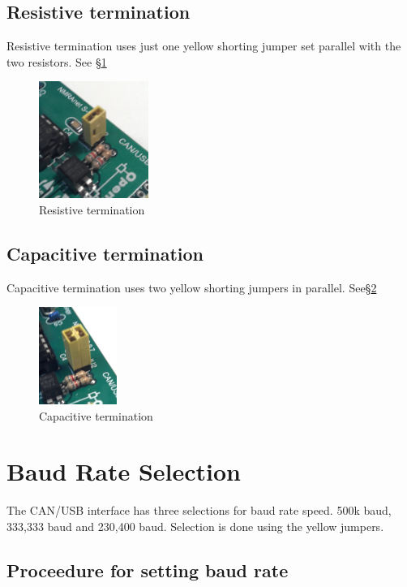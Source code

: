 \documentclass[15pt]{book}
\begin{document}
\subsection{Resistive termination}
Resistive termination uses just one yellow shorting jumper set parallel with the two resistors.  See \S\ref{ResTerm}
\begin{figure}[htbp]
\begin{center}
\includegraphics[height=1.5in]{images/term_resistive.png}
\caption{Resistive termination}
\label{ResTerm}
\end{center}
\end{figure}
\subsection{Capacitive termination}
Capacitive termination uses two yellow shorting jumpers in parallel.  See\S\ref{CapTerm}
\begin{figure}[htbp]
\begin{center}
\includegraphics[width=1in]{images/term_capacitive.png}
\caption{Capacitive termination}
\label{CapTerm}
\end{center}
\end{figure}

\section{Baud Rate Selection}

The CAN/USB interface has three selections for baud rate speed.  500k baud, 333,333 baud and 230,400 baud.  Selection is done using the yellow jumpers.
\subsection{Proceedure for setting baud rate}
\end{document}
